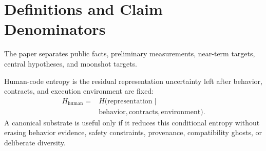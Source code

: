 \section{Definitions and Claim Denominators}

The paper separates public facts, preliminary measurements, near-term targets, central hypotheses, and moonshot targets.

Human-code entropy is the residual representation uncertainty left after behavior, contracts, and execution environment are fixed:
\begin{equation}
\begin{aligned}
H_{\mathrm{human}} ={}& H(\mathrm{representation} \mid \\
&\mathrm{behavior},\mathrm{contracts},\mathrm{environment}).
\end{aligned}
\end{equation}
A canonical substrate is useful only if it reduces this conditional entropy without erasing behavior evidence, safety constraints, provenance, compatibility ghosts, or deliberate diversity.

